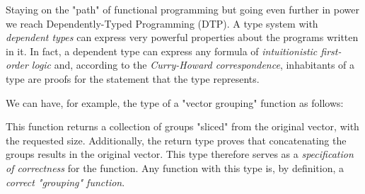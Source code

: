 \documentclass[a4paper]{article}
\begin{document}
        Staying on the "path" of functional programming but going even further in power we reach
        Dependently-Typed Programming (DTP).
        A type system with \emph{dependent types} can express very powerful properties
        about the programs written in it.
        In fact, a dependent type can express any formula of \emph{intuitionistic first-order logic} and,
        according to the \emph{Curry-Howard correspondence},
        inhabitants of a type are proofs for the statement that the type represents.

        We can have, for example, the type of a "vector grouping" function as follows:


        This function returns a collection of groups "sliced" from the original vector, with the requested size.
        Additionally, the return type proves that concatenating the groups results in the original vector.
        This type therefore serves as a \emph{specification of correctness} for the function.
        Any function with this type is, by definition, a \emph{correct "grouping" function}.



    \newpage
    
    
\end{document}
